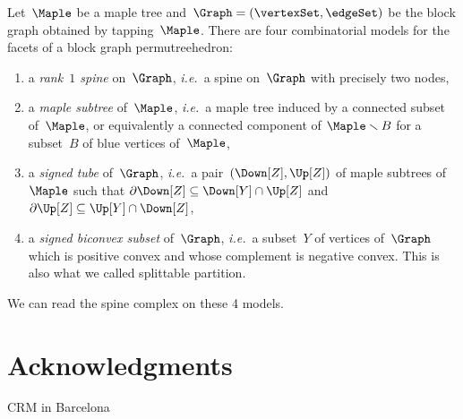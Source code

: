 \documentclass{amsart}
\theoremstyle{definition}
\newcommand{\ssm}{\smallsetminus} %
\newcommand{\ie}{\textit{i.e.}~} %
\newcommand{\darkblue}{\color{darkblue}} %
\newcommand{\defn}[1]{\textsl{\darkblue #1}} %
\begin{document}
Let~$\Maple$ be a maple tree and~$\Graph = (\vertexSet, \edgeSet)$ be the block graph obtained by tapping~$\Maple$.
There are four combinatorial models for the facets of a block graph permutreehedron:
\begin{enumerate}
  \item a \defn{rank~$1$ spine} on~$\Graph$, \ie a spine on~$\Graph$ with precisely two nodes,
  \item a \defn{maple subtree} of~$\Maple$, \ie a maple tree induced by a connected subset of~$\Maple$, or equivalently a connected component of $\Maple \ssm B$ for a subset~$B$ of blue vertices of~$\Maple$,
  \item a \defn{signed tube} of~$\Graph$, \ie a pair~$(\Down[Z], \Up[Z])$ of maple subtrees of~$\Maple$ such that $\partial \Down[Z] \subseteq \Down[Y] \cap \Up[Z]$ and $\partial \Up[Z] \subseteq \Up[Y] \cap \Down[Z]$,
  \item a \defn{signed biconvex subset} of~$\Graph$, \ie a subset~$Y$ of vertices of~$\Graph$ which is positive convex and whose complement is negative convex. This is also what we called splittable partition.
\end{enumerate}
We can read the spine complex on these 4 models.









\section*{Acknowledgments}

CRM in Barcelona 



\label{sec:biblio}
\end{document}
